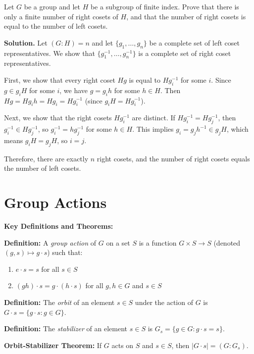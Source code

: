 \begin{problembox}
Let $G$ be a group and let $H$ be a subgroup of finite index. Prove that there is only a finite number of right cosets of $H$, and that the number of right cosets is equal to the number of left cosets.
\end{problembox}

\noindent\textbf{Solution.} Let $(G : H) = n$ and let $\{g_1, \ldots, g_n\}$ be a complete set of left coset representatives. We show that $\{g_1^{-1}, \ldots, g_n^{-1}\}$ is a complete set of right coset representatives.

First, we show that every right coset $Hg$ is equal to $Hg_i^{-1}$ for some $i$. Since $g \in g_iH$ for some $i$, we have $g = g_ih$ for some $h \in H$. Then $Hg = Hg_ih = Hg_i = Hg_i^{-1}$ (since $g_iH = Hg_i^{-1}$).

Next, we show that the right cosets $Hg_i^{-1}$ are distinct. If $Hg_i^{-1} = Hg_j^{-1}$, then $g_i^{-1} \in Hg_j^{-1}$, so $g_i^{-1} = hg_j^{-1}$ for some $h \in H$. This implies $g_i = g_jh^{-1} \in g_jH$, which means $g_iH = g_jH$, so $i = j$.

Therefore, there are exactly $n$ right cosets, and the number of right cosets equals the number of left cosets.

\section{Group Actions}

\textbf{Key Definitions and Theorems:}

\textbf{Definition:} A \textit{group action} of $G$ on a set $S$ is a function $G \times S \to S$ (denoted $(g,s) \mapsto g \cdot s$) such that:
\begin{enumerate}
\item $e \cdot s = s$ for all $s \in S$
\item $(gh) \cdot s = g \cdot (h \cdot s)$ for all $g, h \in G$ and $s \in S$
\end{enumerate}

\textbf{Definition:} The \textit{orbit} of an element $s \in S$ under the action of $G$ is $G \cdot s = \{g \cdot s : g \in G\}$.

\textbf{Definition:} The \textit{stabilizer} of an element $s \in S$ is $G_s = \{g \in G : g \cdot s = s\}$.

\textbf{Orbit-Stabilizer Theorem:} If $G$ acts on $S$ and $s \in S$, then $|G \cdot s| = (G : G_s)$.

